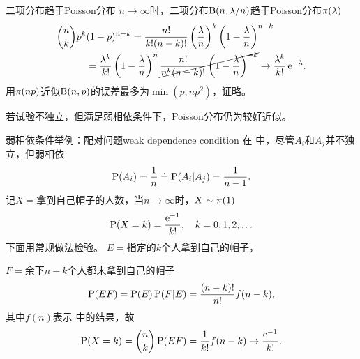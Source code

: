 \begin{theorem}{二项分布趋于Poisson分布}{}
	$n\to\infty$时，二项分布$\Bern(n,\lambda/n)$趋于Poisson分布$\Pois(\lambda)$
	\begin{align*}
		\binom nk p^k&(1-p)^{n-k}=\frac{n!}{k!(n-k)!}\kh{\frac\lambda{n}}^k\kh{1-\frac\lambda{n}}^{n-k}\\
		&=\frac{\lambda^k}{k!}\kh{1-\frac\lambda{n}}^n\cancel{\frac{n!}{n^k(n-k)!}\kh{1-\frac\lambda{n}}^{-k}}\to\frac{\lambda^k}{k!}\e{-\lambda}.
	\end{align*}
	用$\Pois(np)$近似$\Bern(n,p)$的误差最多为$\min(p,np^2)$，证略。
\end{theorem}

若试验不独立，但满足弱相依条件下，Poisson分布仍为较好近似。
\begin{example}{弱相依条件举例：配对问题}{weak dependence condition}
	在 中，尽管$A_i$和$A_j$并不独立，但弱相依
	\[
		\P(A_i)=\frac1n\doteq\P(A_i|A_j)=\frac1{n-1}.
	\]
	记$X=$拿到自己帽子的人数，当$n\to\infty$时，$X\sim\Pois(1)$
	\[
		\P(X=k)=\frac{\e{-1}}{k!},\quad k=0,1,2,\ldots
	\]
	下面用常规做法检验。
	\tcblower
	$E=$指定的$k$个人拿到自己的帽子，
	
	$F=$余下$n-k$个人都未拿到自己的帽子
	\[
		\P(EF)=\P(E)\P(F|E)=\frac{(n-k)!}{n!}f(n-k),
	\]
	其中$f(n)$表示 中的结果，故
	\[
		\P(X=k)=\binom nk\P(EF)=\frac1{k!}f(n-k)\to\frac{\e{-1}}{k!}.
	\]
\end{example}
